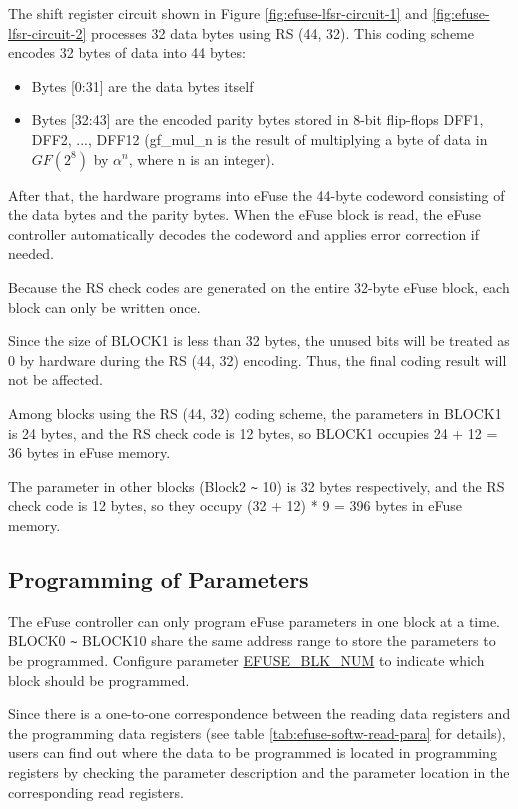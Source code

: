 \documentclass[main\_\_EN.tex]{subfiles}
\begin{document}
The shift register circuit shown in Figure \ref{fig:efuse-lfsr-circuit-1} and \ref{fig:efuse-lfsr-circuit-2} processes 32 data bytes using RS (44, 32). This coding scheme encodes 32 bytes of  data into 44 bytes:

\begin{itemize}
    \item Bytes [0:31] are the data bytes itself
    \item Bytes [32:43] are the encoded parity bytes stored in 8-bit flip-flops DFF1, DFF2, ..., DFF12 (gf\_mul\_n is the result of multiplying a byte of data in \(GF(2^8)\) by \(\alpha^n\), where n is an integer).
\end{itemize}

After that, the hardware programs into eFuse the 44-byte codeword consisting of the data bytes and the parity bytes. When the eFuse block is read, the eFuse controller automatically decodes the codeword and applies error correction if needed.

Because the RS check codes are generated on the entire 32-byte eFuse block, each block can only be written once.

Since the size of BLOCK1 is less than 32 bytes, the unused bits will be treated as 0 by hardware during the RS (44, 32) encoding. Thus, the final coding result will not be affected.

Among blocks using the RS (44, 32) coding scheme, the parameters in BLOCK1 is 24 bytes, and the RS check code is 12 bytes, so BLOCK1 occupies 24 + 12 = 36 bytes in eFuse memory.

The parameter in other blocks (Block2 \verb+~+ 10) is 32 bytes respectively, and the RS check code is 12 bytes, so they occupy (32 + 12) * 9 = 396 bytes in eFuse memory.

\subsection{Programming of Parameters}
\label{sec:efuse-software-programming-para}

The eFuse controller can only program eFuse parameters in one block at a time. BLOCK0 \verb+~+ BLOCK10 share the same address range to store the parameters to be programmed. Configure parameter \hyperref[fielddesc:EFUSEBLKNUM]{EFUSE\_BLK\_NUM} to indicate which block should be programmed.

Since there is a one-to-one correspondence between the reading data registers and the programming data registers (see table \ref{tab:efuse-softw-read-para} for details), users can find out where the data to be programmed is located in programming registers by checking the parameter description and the parameter location in the corresponding read registers.
\end{document}
